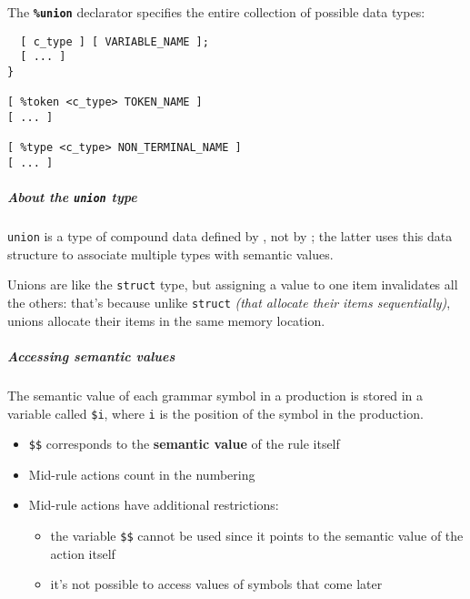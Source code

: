 \documentclass[english]{article}
\begin{document}
The \textbf{\texttt{\%union}} declarator specifies the entire collection of possible data types:


\begin{onepage}
  \begin{lstlisting}[language=LANCE, caption={Semantic value declaration}, label={lst:bison-semantic-value-declaration}]
%union {
  [ c_type ] [ VARIABLE_NAME ];
  [ ... ]
}

[ %token <c_type> TOKEN_NAME ]
[ ... ]

[ %type <c_type> NON_TERMINAL_NAME ]
[ ... ]
\end{lstlisting}
\end{onepage}

\subparagraph*{About the \texttt{union} type}
\texttt{union} is a type of compound data defined by \clang, not by \bison;
the latter uses this data structure to associate multiple types with semantic values.

Unions are like the \texttt{struct} type, but assigning a value to one item invalidates all the others:
that's because unlike \texttt{struct} \textit{(that allocate their items sequentially)}, unions allocate their items in the same memory location.

\subparagraph*{Accessing semantic values}
The semantic value of each grammar symbol in a production is stored in a variable called \texttt{\$i}, where \texttt{i} is the position of the symbol in the production.

\begin{itemize}
  \item \texttt{\$\$} corresponds to the \textbf{semantic value} of the rule itself
  \item Mid-rule actions count in the numbering
  \item Mid-rule actions have additional restrictions:
        \begin{itemize}
          \item the variable \texttt{\$\$} cannot be used since it points to the semantic value of the action itself
          \item it's not possible to access values of symbols that come later
        \end{itemize}
\end{itemize}
\end{document}
